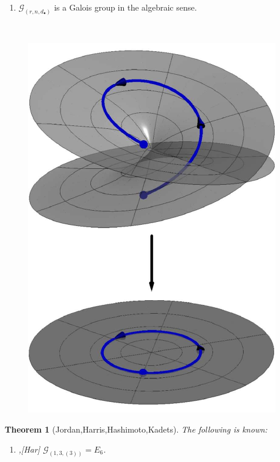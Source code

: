 \documentclass[final]{beamer}
\theoremstyle{thrm}
\newtheorem{thm}{Theorem}
\begin{document}
\begin{frame}
\begin{minipage}[t]{.3\textwidth}
\begin{minipage}{.65\textwidth}
\begin{enumerate}
\item[$\bullet$] $\mathcal{G}_{(r,n,d_\bullet)}$ is a Galois group in the algebraic sense.
\end{enumerate}
\end{minipage}
%
\begin{minipage}{.02\textwidth}
~
\end{minipage}
%
\begin{minipage}{.3\textwidth}
\begin{center}
\begin{figure}
\includegraphics[scale=.95]{figures/monodromy.pdf}
\end{figure}
\end{center}
\end{minipage}

\vspace{.4cm}

\begin{thm}[Jordan,Harris,Hashimoto,Kadets]
\vspace{.2cm}
The following is known:
\begin{enumerate}
\item[$\bullet$] [J],[Har] $\mathcal{G}_{(1,3,(3))} = E_6$.


\end{enumerate}
\end{thm}
\end{minipage}
\end{frame}
\end{document}
